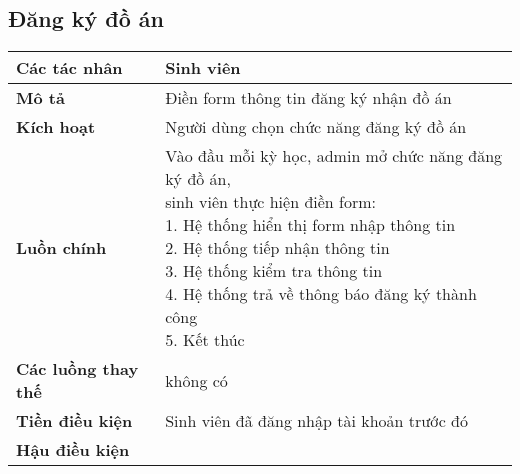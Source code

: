 	\subsection*{Đăng ký đồ án}
	\begin{tabular}{|l|p{}|}
		\hline
		\textbf{Các tác nhân}         & Sinh viên                                                                                         \\
		\hline
		\textbf{Mô tả}                & Điền form thông tin đăng ký nhận đồ án                                                            \\
		\hline
		\textbf{Kích hoạt}            & Người dùng chọn chức năng đăng ký đồ án                                                           \\
		\hline
		\textbf{Luồn chính}           & \makecell[l]{Vào đầu mỗi kỳ học, admin mở chức năng đăng ký đồ án, \\sinh viên thực hiện điền form: \\ 1. Hệ thống hiển thị form nhập thông tin \\ 2. Hệ thống tiếp nhận thông tin \\ 3. Hệ thống kiểm tra thông tin \\ 4. Hệ thống trả về thông báo đăng ký thành công \\ 5. Kết thúc} \\
		\hline
		\textbf{Các luồng thay thế}   & không có                                                                                          \\
		\hline
		\textbf{Tiền điều kiện}       & Sinh viên đã đăng nhập tài khoản trước đó                                                         \\
		\hline
		\textbf{Hậu điều kiện}        &                                                                                                   \\
		\hline
	\end{tabular}

